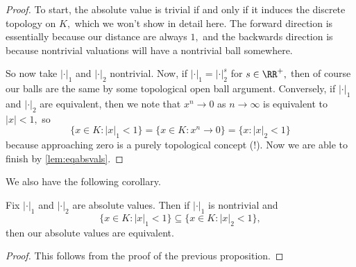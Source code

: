 \begin{proof}
	To start, the absolute value is trivial if and only if it induces the discrete topology on $K,$ which we won't show in detail here. The forward direction is essentially because our distance are always $1,$ and the backwards direction is because nontrivial valuations will have a nontrivial ball somewhere.

	So now take $|\cdot|_1$ and $|\cdot|_2$ nontrivial. Now, if $|\cdot|_1=|\cdot|_2^s$ for $s\in\RR^+,$ then of course our balls are the same by some topological open ball argument. Conversely, if $|\cdot|_1$ and $|\cdot|_2$ are equivalent, then we note that $x^n\to0$ as $n\to\infty$ is equivalent to $|x|<1,$ so
	\[\{x\in K:|x|_1<1\}=\{x\in K:x^n\to0\}=\{x:|x|_2<1\}\]
	because approaching zero is a purely topological concept (!). Now we are able to finish by \autoref{lem:eqabsvals}.
\end{proof}
We also have the following corollary.
\begin{corollary} \label{lem:eqivcor}
	Fix $|\cdot|_1$ and $|\cdot|_2$ are absolute values. Then if $|\cdot|_1$ is nontrivial and
	\[\{x\in K:|x|_1<1\}\subseteq\{x\in K:|x|_2<1\},\]
	then our absolute values are equivalent.
\end{corollary}
\begin{proof}
	This follows from the proof of the previous proposition.
\end{proof}

